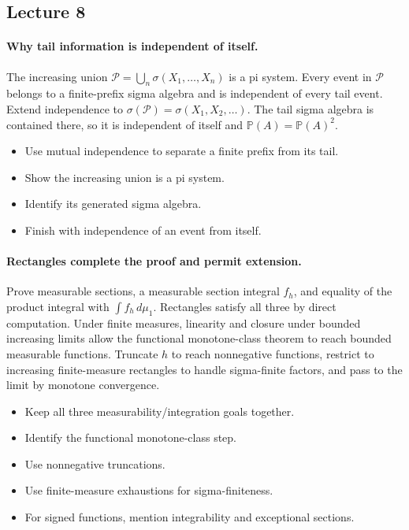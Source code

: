 \documentclass[11pt,letterpaper]{article}
\begin{document}
\subsection{Lecture 8}
\hypertarget{answer-l8-s3}{}\paragraph{Why tail information is independent of itself.}
The increasing union $\mathcal P=\bigcup_n\sigma(X_1,\ldots,X_n)$ is a pi system. Every event in $\mathcal P$ belongs to a finite-prefix sigma algebra and is independent of every tail event. Extend independence to $\sigma(\mathcal P)=\sigma(X_1,X_2,\ldots)$. The tail sigma algebra is contained there, so it is independent of itself and $\mathbb P(A)=\mathbb P(A)^2$.
\begin{itemize}
\item Use mutual independence to separate a finite prefix from its tail.
\item Show the increasing union is a pi system.
\item Identify its generated sigma algebra.
\item Finish with independence of an event from itself.
\end{itemize}
\hypertarget{answer-l8-s9}{}\paragraph{Rectangles complete the proof and permit extension.}
Prove measurable sections, a measurable section integral $f_h$, and equality of the product integral with $\int f_h\,d\mu_1$. Rectangles satisfy all three by direct computation. Under finite measures, linearity and closure under bounded increasing limits allow the functional monotone-class theorem to reach bounded measurable functions. Truncate $h$ to reach nonnegative functions, restrict to increasing finite-measure rectangles to handle sigma-finite factors, and pass to the limit by monotone convergence.
\begin{itemize}
\item Keep all three measurability/integration goals together.
\item Identify the functional monotone-class step.
\item Use nonnegative truncations.
\item Use finite-measure exhaustions for sigma-finiteness.
\item For signed functions, mention integrability and exceptional sections.
\end{itemize}
\end{document}
